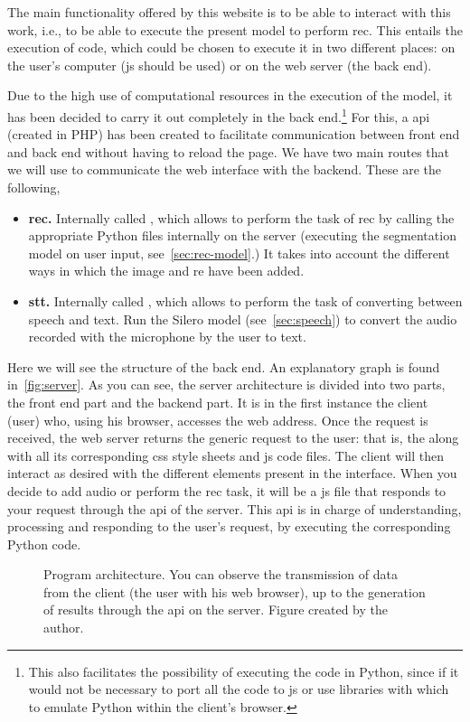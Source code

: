 The main functionality offered by this website is to be able to interact with
this work, i.e., to be able to execute the present model to perform
\gls{rec}. This entails the execution of code, which could be chosen to execute
it in two different places: on the user's computer (\acl{js} should be used) or
on the web server (the back end).

Due to the high use of computational resources in the execution of the model,
it has been decided to carry it out completely in the back end.\footnote{This
  also facilitates the possibility of executing the code in Python, since if it
  would not be necessary to port all the code to \acl{js} or use libraries with
  which to emulate Python within the client's browser.} For this, a \gls{api}
(created in PHP) has been created to facilitate communication between front end
and back end without having to reload the page. We have two main routes that we
will use to communicate the web interface with the backend. These are the
following,
\begin{itemize}
  \item \textbf{\gls{rec}.} Internally called , which
  allows to perform the task of \gls{rec} by calling the appropriate Python
  files internally on the server (executing the segmentation model on user
  input, see\ \vref{sec:rec-model}.) It takes into account the different ways in
  which the image and \gls{re} have been added.
  \item \textbf{\gls{stt}.} Internally called , which allows
  to perform the task of converting between speech and text. Run the Silero
  model (see\ \vref{sec:speech}) to convert the audio recorded with the
  microphone by the user to text.
\end{itemize}

Here we will see the structure of the back end. An explanatory graph is found
in\ \vref{fig:server}. As you can see, the server architecture is divided into
two parts, the front end part and the backend part. It is in the first instance
the client (user) who, using his browser, accesses the web address. Once the
request is received, the web server returns the generic request to the user:
that is, the  along with all its corresponding \acs{css} style
sheets and \acs{js} code files. The client will then interact as desired with
the different elements present in the interface. When you decide to add audio
or perform the \gls{rec} task, it will be a \acs{js} file that responds to your
request through the \gls{api} of the server. This \gls{api} is in charge of
understanding, processing and responding to the user's request, by executing
the corresponding Python code.

\begin{figure}[p]
  \centering
  
  \caption[Program architecture]{Program architecture. You can observe the
    transmission of data from the client (the user with his web browser), up to
    the generation of results through the \gls{api} on the server. Figure
    created by the author.}%
  \label{fig:server}
\end{figure}
